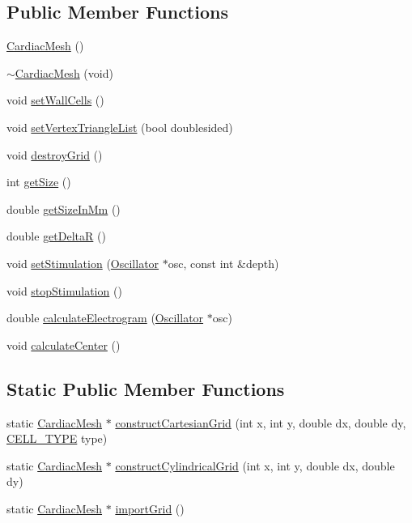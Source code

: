 \subsection*{Public Member Functions}
\begin{DoxyCompactItemize}
\item 
\hyperlink{class_cardiac_mesh_a864c30e0e6cdab5e1a1e39ab99a45e5b}{Cardiac\+Mesh} ()
\item 
\hyperlink{class_cardiac_mesh_a91b0200d15669cbdef50c3d8a6ad523f}{$\sim$\+Cardiac\+Mesh} (void)
\item 
void \hyperlink{class_cardiac_mesh_ae84e8d8f86a437e47ea99d1bf212e2ce}{set\+Wall\+Cells} ()
\item 
void \hyperlink{class_cardiac_mesh_ae6002bc62e88a0a4b21ba222adc04e25}{set\+Vertex\+Triangle\+List} (bool doublesided)
\item 
void \hyperlink{class_cardiac_mesh_ac4e6a0774e1b1abf2ddbf2cc59434a92}{destroy\+Grid} ()
\item 
int \hyperlink{class_cardiac_mesh_afabd19504c5ea0168100a86205b3ccb6}{get\+Size} ()
\item 
double \hyperlink{class_cardiac_mesh_a67e146331d7c41e3d528861594ac577e}{get\+Size\+In\+Mm} ()
\item 
double \hyperlink{class_cardiac_mesh_ab4705e8f6f5657337295f076494e9a45}{get\+Delta\+R} ()
\item 
void \hyperlink{class_cardiac_mesh_a22bc3080340bc2ecad69e151098edaf5}{set\+Stimulation} (\hyperlink{class_oscillator}{Oscillator} $\ast$osc, const int \&depth)
\item 
void \hyperlink{class_cardiac_mesh_a5b11cbba123533dcf60e5bf1a7bba9cc}{stop\+Stimulation} ()
\item 
double \hyperlink{class_cardiac_mesh_abf74825fdb7bc14445c25877f06e36af}{calculate\+Electrogram} (\hyperlink{class_oscillator}{Oscillator} $\ast$osc)
\item 
void \hyperlink{class_cardiac_mesh_a92f03d96fb065ce0d12b3865182ec1b7}{calculate\+Center} ()
\end{DoxyCompactItemize}
\subsection*{Static Public Member Functions}
\begin{DoxyCompactItemize}
\item 
static \hyperlink{class_cardiac_mesh}{Cardiac\+Mesh} $\ast$ \hyperlink{class_cardiac_mesh_a1b47716c2b8eee65b46d9cd47e7abb8e}{construct\+Cartesian\+Grid} (int x, int y, double dx, double dy, \hyperlink{heart_defines_8h_a2f059cd81f362503874790462d535f5b}{C\+E\+L\+L\+\_\+\+T\+Y\+P\+E} type)
\item 
static \hyperlink{class_cardiac_mesh}{Cardiac\+Mesh} $\ast$ \hyperlink{class_cardiac_mesh_a706d5859f0b6d12d979ad6a102fc5f94}{construct\+Cylindrical\+Grid} (int x, int y, double dx, double dy)
\item 
static \hyperlink{class_cardiac_mesh}{Cardiac\+Mesh} $\ast$ \hyperlink{class_cardiac_mesh_ad0cfebe688a681428d5cb3f69d7cb839}{import\+Grid} ()
\end{DoxyCompactItemize}
